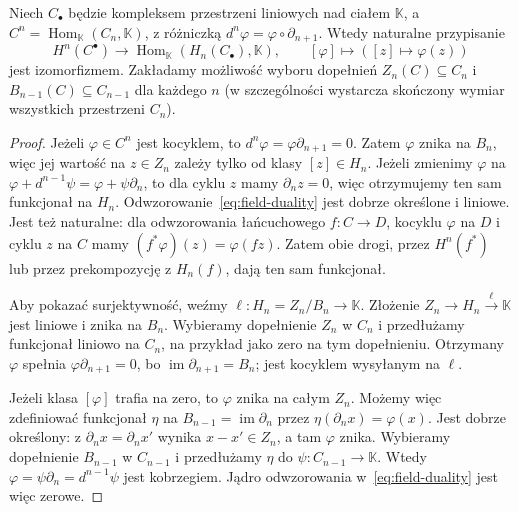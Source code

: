 \begin{twierdzenie}
\label{thm:field-hom-dual}
Niech $C_\bullet$ będzie kompleksem
przestrzeni liniowych nad ciałem
$\mathbb K$, a
$C^n=\operatorname{Hom}_{\mathbb K}(C_n,\mathbb K)$,
z różniczką $d^n\varphi=\varphi\circ\partial_{n+1}$.
Wtedy naturalne przypisanie
\begin{equation}\label{eq:field-duality}
 H^n(C^\bullet)
 \longrightarrow\operatorname{Hom}_{\mathbb K}
  (H_n(C_\bullet),\mathbb K),
 \qquad [\varphi]\longmapsto
     ([z]\longmapsto\varphi(z))
\end{equation}
jest izomorfizmem. Zakładamy możliwość wyboru
dopełnień $Z_n(C)\subseteq C_n$ i
$B_{n-1}(C)\subseteq C_{n-1}$ dla każdego $n$
(w szczególności wystarcza skończony wymiar
wszystkich przestrzeni $C_n$).
\end{twierdzenie}
\begin{proof}
Jeżeli $\varphi\in C^n$ jest kocyklem,
to $d^n\varphi=\varphi \partial_{n+1}=0$.
Zatem $\varphi$ znika na $B_n$,
więc jej wartość na $z\in Z_n$
zależy tylko od klasy $[z]\in H_n$.
Jeżeli zmienimy $\varphi$ na
$\varphi+d^{n-1}\psi
=\varphi+\psi \partial_n$, to dla cyklu $z$
mamy $\partial_nz=0$, więc otrzymujemy
ten sam funkcjonał na $H_n$.
Odwzorowanie~\eqref{eq:field-duality} jest
dobrze określone i liniowe. Jest też naturalne: dla odwzorowania
łańcuchowego $f:C\to D$, kocyklu $\varphi$ na $D$ i cyklu $z$ na $C$
mamy $(f^*\varphi)(z)=\varphi(fz)$. Zatem obie drogi, przez
$H^n(f^*)$ lub przez prekompozycję z $H_n(f)$, dają ten sam funkcjonał.

Aby pokazać surjektywność, weźmy
$\ell:H_n=Z_n/B_n\to\mathbb K$.
Złożenie $Z_n\to H_n\xrightarrow{\ell}\mathbb K$
jest liniowe i znika na $B_n$.
Wybieramy dopełnienie $Z_n$ w $C_n$
i przedłużamy funkcjonał liniowo
na $C_n$, na przykład jako zero
na tym dopełnieniu. Otrzymany
$\varphi$ spełnia
$\varphi \partial_{n+1}=0$, bo
$\operatorname{im}\partial_{n+1}=B_n$;
jest kocyklem wysyłanym na $\ell$.

Jeżeli klasa $[\varphi]$ trafia na zero,
to $\varphi$ znika na całym $Z_n$.
Możemy więc zdefiniować funkcjonał
$\eta$ na $B_{n-1}=\operatorname{im}\partial_n$
przez $\eta(\partial_nx)=\varphi(x)$.
Jest dobrze określony: z
$\partial_nx=\partial_nx'$ wynika $x-x'\in Z_n$,
a tam $\varphi$ znika.
Wybieramy dopełnienie $B_{n-1}$
w $C_{n-1}$ i przedłużamy $\eta$
do $\psi:C_{n-1}\to\mathbb K$.
Wtedy $\varphi=\psi \partial_n=d^{n-1}\psi$
jest kobrzegiem. Jądro odwzorowania
w~\eqref{eq:field-duality} jest więc zerowe.
\end{proof}

